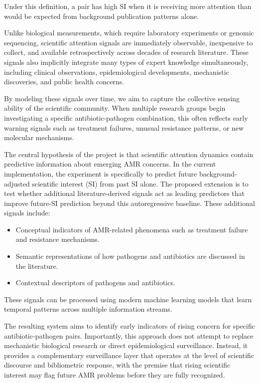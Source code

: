 \documentclass[
]{article}
\providecommand{\tightlist}{%
  \setlength{\itemsep}{0pt}\setlength{\parskip}{0pt}}
\begin{document}
Under this definition, a pair has high SI when it is receiving more
attention than would be expected from background publication patterns
alone.

Unlike biological measurements, which require laboratory experiments or
genomic sequencing, scientific attention signals are immediately
observable, inexpensive to collect, and available retrospectively across
decades of research literature. These signals also implicitly integrate
many types of expert knowledge simultaneously, including clinical
observations, epidemiological developments, mechanistic discoveries, and
public health concerns.

By modeling these signals over time, we aim to capture the collective
sensing ability of the scientific community. When multiple research
groups begin investigating a specific antibiotic-pathogen combination,
this often reflects early warning signals such as treatment failures,
unusual resistance patterns, or new molecular mechanisms.

The central hypothesis of the project is that scientific attention
dynamics contain predictive information about emerging AMR concerns. In
the current implementation, the experiment is specifically to predict
future background-adjusted scientific interest (SI) from past SI alone.
The proposed extension is to test whether additional literature-derived
signals act as leading predictors that improve future-SI prediction
beyond this autoregressive baseline. These additional signals include:

\begin{itemize}
\tightlist
\item
  Conceptual indicators of AMR-related phenomena such as treatment
  failure and resistance mechanisms.
\item
  Semantic representations of how pathogens and antibiotics are
  discussed in the literature.
\item
  Contextual descriptors of pathogens and antibiotics.
\end{itemize}

These signals can be processed using modern machine learning models that
learn temporal patterns across multiple information streams.

The resulting system aims to identify early indicators of rising concern
for specific antibiotic-pathogen pairs. Importantly, this approach does
not attempt to replace mechanistic biological research or direct
epidemiological surveillance. Instead, it provides a complementary
surveillance layer that operates at the level of scientific discourse
and bibliometric response, with the premise that rising scientific
interest may flag future AMR problems before they are fully recognized.
\end{document}
